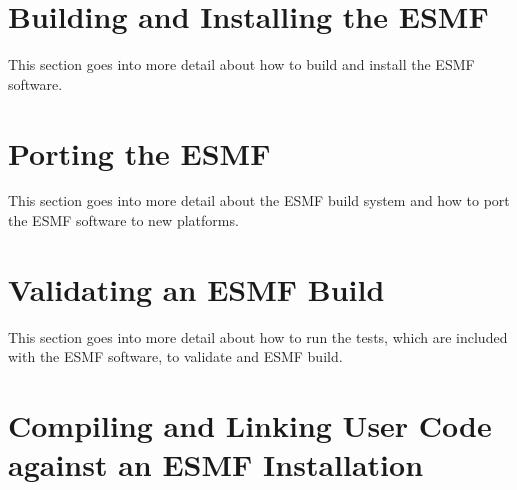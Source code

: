 
\setlength{\parskip}{1.5ex}
\setlength{\parindent}{0em}


\section{Building and Installing the ESMF}
\label{sec:TechOver}

This section goes into more detail about how to build and install the ESMF
software.




\section{Porting the ESMF}
\label{sec:TechOverPort}

This section goes into more detail about the ESMF build system and how to
port the ESMF software to new platforms.




\section{Validating an ESMF Build}
\label{sec:TechOver2}

This section goes into more detail about how to run the tests, which are
included with the ESMF software, to validate and ESMF build.




\newpage
\section{Compiling and Linking User Code against an ESMF Installation}
\label{sec:Use}




%
